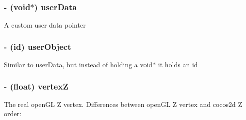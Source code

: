 \hypertarget{class_c_c_node_aa59560e27cc9c1cc51f95def93c60125}{
\subsubsection[{user\-Data}]{\setlength{\rightskip}{0pt plus 5cm}-\/ (void$\ast$) {\bf user\-Data}}}\label{class_c_c_node_aa59560e27cc9c1cc51f95def93c60125}
A custom user data pointer \hypertarget{class_c_c_node_a34b5b9ac2ad6129cae7cbdedfe6f12a1}{
\subsubsection[{user\-Object}]{\setlength{\rightskip}{0pt plus 5cm}-\/ (id) {\bf user\-Object}}}\label{class_c_c_node_a34b5b9ac2ad6129cae7cbdedfe6f12a1}
Similar to user\-Data, but instead of holding a void$\ast$ it holds an id \hypertarget{class_c_c_node_aad1293ecdafd361d5e62a47e83002835}{
\subsubsection[{vertex\-Z}]{\setlength{\rightskip}{0pt plus 5cm}-\/ (float) {\bf vertex\-Z}}}\label{class_c_c_node_aad1293ecdafd361d5e62a47e83002835}
The real open\-G\-L Z vertex. Differences between open\-G\-L Z vertex and cocos2d Z order\-:
